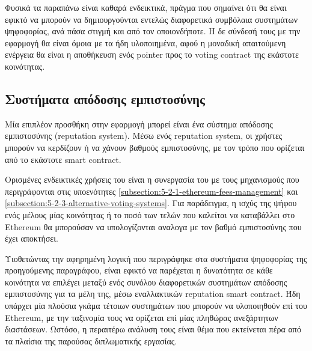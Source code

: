 Φυσικά τα παραπάνω είναι καθαρά ενδεικτικά, πράγμα που σημαίνει ότι θα είναι εφικτό να μπορούν να δημιουργούνται εντελώς διαφορετικά συμβόλαια συστημάτων ψηφοφορίας, ανά πάσα στιγμή και από τον οποιονδήποτε. Η δε σύνδεσή τους με την εφαρμογή θα είναι όμοια με τα ήδη υλοποιημένα, αφού η μοναδική απαιτούμενη ενέργεια θα είναι η αποθήκευση ενός pointer προς το voting contract της εκάστοτε κοινότητας.

\subsection{Συστήματα απόδοσης εμπιστοσύνης}\label{subsection:5-2-4-reputation-systems}

Μία επιπλέον προσθήκη στην εφαρμογή μπορεί είναι ένα σύστημα απόδοσης εμπιστοσύνης (reputation system). Μέσω ενός reputation system, οι χρήστες μπορούν να κερδίζουν ή να χάνουν βαθμούς εμπιστοσύνης, με τον τρόπο που ορίζεται από το εκάστοτε smart contract.

Ορισμένες ενδεικτικές χρήσεις του είναι η συνεργασία του με τους μηχανισμούς που περιγράφονται στις υποενότητες \ref{subsection:5-2-1-ethereum-fees-management} και \ref{subsection:5-2-3-alternative-voting-systems}. Για παράδειγμα, η ισχύς της ψήφου ενός μέλους μίας κοινότητας ή το ποσό των τελών που καλείται να καταβάλλει στο Ethereum θα μπορούσαν να υπολογίζονται αναλογα με τον βαθμό εμπιστοσύνης που έχει αποκτήσει.

Υιοθετώντας την αφηρημένη λογική που περιγράφηκε στα συστήματα ψηφοφορίας της προηγούμενης παραγράφου, είναι εφικτό να παρέχεται η δυνατότητα σε κάθε κοινότητα να επιλέγει μεταξύ ενός συνόλου διαφορετικών συστημάτων απόδοσης εμπιστοσύνης για τα μέλη της, μέσω εναλλακτικών reputation smart contract. Ήδη υπάρχει μία πλούσια γκάμα τέτοιων συστημάτων που μπορούν να υλοποιηθούν επί του Ethereum, με την ταξινομία τους να ορίζεται επί μίας πληθώρας ανεξάρτητων διαστάσεων\cite{5.2-taxonomy-of-reputation-systems}. Ωστόσο, η περαιτέρω ανάλυση τους είναι θέμα που εκτείνεται πέρα από τα πλαίσια της παρούσας διπλωματικής εργασίας.
